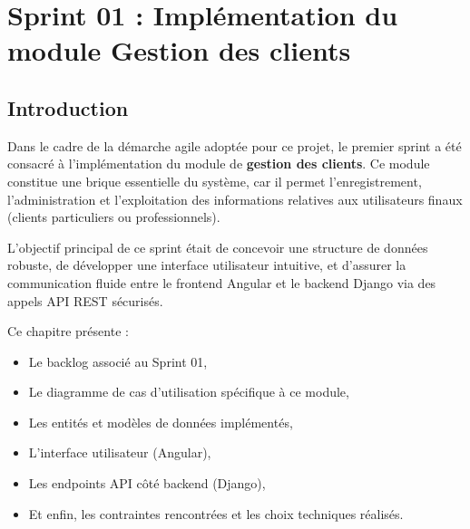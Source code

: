 \chapter{Sprint 01 : Implémentation du module Gestion des clients}

\section*{Introduction}

Dans le cadre de la démarche agile adoptée pour ce projet, le premier sprint a été consacré à l’implémentation du module de \textbf{gestion des clients}. Ce module constitue une brique essentielle du système, car il permet l’enregistrement, l’administration et l’exploitation des informations relatives aux utilisateurs finaux (clients particuliers ou professionnels).

L’objectif principal de ce sprint était de concevoir une structure de données robuste, de développer une interface utilisateur intuitive, et d’assurer la communication fluide entre le frontend Angular et le backend Django via des appels API REST sécurisés.

Ce chapitre présente :
\begin{itemize}
    \item Le backlog associé au Sprint 01,
    \item Le diagramme de cas d’utilisation spécifique à ce module,
    \item Les entités et modèles de données implémentés,
    \item L’interface utilisateur (Angular),
    \item Les endpoints API côté backend (Django),
    \item Et enfin, les contraintes rencontrées et les choix techniques réalisés.
\end{itemize}


